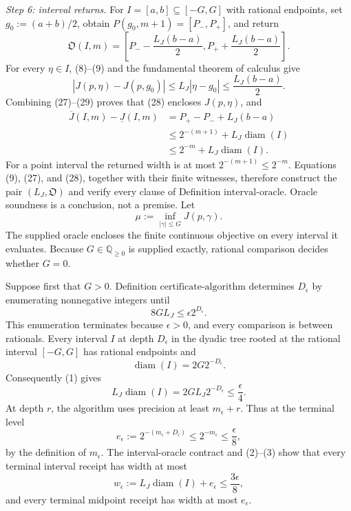 \emph{Step 6: interval returns.}
For \(I=[a,b]\subseteq[-G,G]\) with rational endpoints, set \(g_0:=(a+b)/2\), obtain \(P(g_0,m+1)=[P_-,P_+]\), and return
\[
 \mathfrak O(I,m)=
 \left[P_--\frac{L_J(b-a)}2,
 P_++\frac{L_J(b-a)}2\right].
\tag{28}
\]
For every \(\eta\in I\), (8)--(9) and the fundamental theorem of calculus give
\[
 |J(p,\eta)-J(p,g_0)|
 \leq L_J|\eta-g_0|
 \leq\frac{L_J(b-a)}2.
\tag{29}
\]
Combining (27)--(29) proves that (28) encloses \(J(p,\eta)\), and
\[
 \begin{aligned}
 \overline J(I,m)-\underline J(I,m)
 &=P_+-P_-+L_J(b-a)\\
 &\leq2^{-(m+1)}+L_J\operatorname{diam}(I)\\
 &\leq2^{-m}+L_J\operatorname{diam}(I).
 \end{aligned}
\tag{30}
\]
For a point interval the returned width is at most \(2^{-(m+1)}\leq2^{-m}\).  Equations (9), (27), and (28), together with their finite witnesses, therefore construct the pair \((L_J,\mathfrak O)\) and verify every clause of Definition \(\mathrm{interval\mbox{-}oracle}\).  Oracle soundness is a conclusion, not a premise.
Let
\[
 \mu:=\inf_{|\gamma|\leq G}J(p,\gamma).
\]
The supplied oracle encloses the finite continuous objective on every interval it evaluates.  Because \(G\in\mathbb Q_{\geq0}\) is supplied exactly, rational comparison decides whether \(G=0\).

Suppose first that \(G>0\).  Definition \(\mathrm{certificate\mbox{-}algorithm}\) determines \(D_\epsilon\) by enumerating nonnegative integers until
\[
 8GL_J\leq\epsilon2^{D_\epsilon}.
\tag{1}
\]
This enumeration terminates because \(\epsilon>0\), and every comparison is between rationals.  Every interval \(I\) at depth \(D_\epsilon\) in the dyadic tree rooted at the rational interval \([-G,G]\) has rational endpoints and
\[
 \operatorname{diam}(I)=2G2^{-D_\epsilon}.
\]
Consequently (1) gives
\[
 L_J\operatorname{diam}(I)
 =2GL_J2^{-D_\epsilon}\leq\frac\epsilon4.
\tag{2}
\]
At depth \(r\), the algorithm uses precision at least \(m_\epsilon+r\).  Thus at the terminal level
\[
 e_\epsilon:=2^{-(m_\epsilon+D_\epsilon)}
 \leq2^{-m_\epsilon}\leq\frac\epsilon8,
\tag{3}
\]
by the definition of \(m_\epsilon\).  The interval-oracle contract and (2)--(3) show that every terminal interval receipt has width at most
\[
 w_\epsilon:=L_J\operatorname{diam}(I)+e_\epsilon
 \leq\frac{3\epsilon}{8},
\tag{4}
\]
and every terminal midpoint receipt has width at most \(e_\epsilon\).

